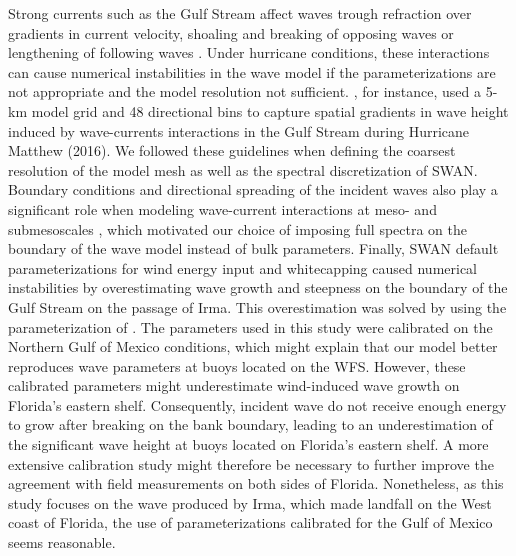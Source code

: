 \documentclass[preprint,12pt,authoryear]{elsarticle}
\begin{document}
Strong currents such as the Gulf Stream affect waves trough refraction over gradients in current velocity, shoaling and breaking of opposing waves or lengthening of following waves \citep{hegermiller2019wave}. Under hurricane conditions, these interactions can cause numerical instabilities in the wave model if the parameterizations are not appropriate and the model resolution not sufficient. \cite{hegermiller2019wave}, for instance, used a 5-km model grid and 48 directional bins to capture spatial gradients in wave height induced by wave-currents interactions in the Gulf Stream during Hurricane Matthew (2016). We followed these guidelines when defining the coarsest resolution of the model mesh as well as the spectral discretization of SWAN. Boundary conditions and directional spreading of the incident waves also play a significant role when modeling wave-current interactions at meso- and submesoscales \citep{villas2020wave}, which motivated our choice of imposing full spectra on the boundary of the wave model instead of bulk parameters. Finally, SWAN default parameterizations for wind energy input and whitecapping caused numerical instabilities by overestimating wave growth and steepness on the boundary of the Gulf Stream on the passage of Irma. This overestimation was solved by using the parameterization of \cite{siadatmousavi2011evaluation}. The parameters used in this study were calibrated on the Northern Gulf of Mexico conditions, which might explain that our model better reproduces wave parameters at buoys located on the WFS. However, these calibrated parameters might underestimate wind-induced wave growth on Florida's eastern shelf. Consequently, incident wave do not receive enough energy to grow after breaking on the bank boundary, leading to an underestimation of the significant wave height at buoys located on Florida's eastern shelf. A more extensive calibration study might therefore be necessary to further improve the agreement with field measurements on both sides of Florida. Nonetheless, as this study focuses on the wave produced by Irma, which made landfall on the West coast of Florida, the use of parameterizations calibrated for the Gulf of Mexico seems reasonable.
\end{document}
